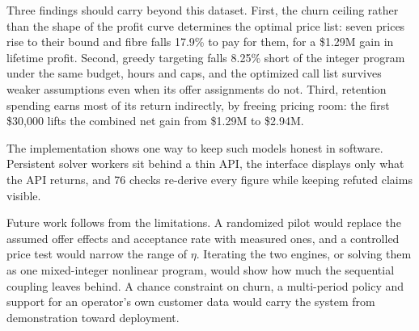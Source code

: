 \documentclass[conference]{IEEEtran}
\begin{document}
Three findings should carry beyond this dataset. First, the churn ceiling rather than the shape of the profit curve determines the optimal price list: seven prices rise to their bound and fibre falls 17.9\% to pay for them, for a \$1.29M gain in lifetime profit. Second, greedy targeting falls 8.25\% short of the integer program under the same budget, hours and caps, and the optimized call list survives weaker assumptions even when its offer assignments do not. Third, retention spending earns most of its return indirectly, by freeing pricing room: the first \$30,000 lifts the combined net gain from \$1.29M to \$2.94M.

The implementation shows one way to keep such models honest in software. Persistent solver workers sit behind a thin API, the interface displays only what the API returns, and 76 checks re-derive every figure while keeping refuted claims visible.

Future work follows from the limitations. A randomized pilot would replace the assumed offer effects and acceptance rate with measured ones, and a controlled price test would narrow the range of $\eta$. Iterating the two engines, or solving them as one mixed-integer nonlinear program, would show how much the sequential coupling leaves behind. A chance constraint on churn, a multi-period policy and support for an operator's own customer data would carry the system from demonstration toward deployment.
\end{document}
